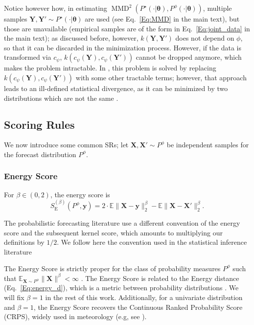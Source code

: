 \documentclass[twoside,11pt]{article}
\newcommand{\E}{\mathbb{E}}
\newcommand{\ddtheta}{\boldsymbol{\theta}}
\newcommand{\ddobs}{\mathbf{y}}
\newcommand{\Ddsim}{\mathbf{X}}
\newcommand{\Ddobs}{\mathbf{Y}}
\newcommand{\SE}{S_{\operatorname{E}}}
\begin{document}
	Notice however how, in estimating $ \operatorname{MMD}^2 \left({P}^{\star}(\cdot|\ddtheta ), {P}^{\phi}(\cdot|\ddtheta )\right)$, multiple samples $ \Ddobs,\Ddobs'\sim {P}^{\star}(\cdot|\ddtheta) $ are used (see Eq.~\ref{Eq:MMD} in the main text), but those are unavailable (empirical samples are of the form in Eq.~\ref{Eq:joint_data} in the main text); as discussed before, however, $ k(\Ddobs,\Ddobs') $ does not depend on $ \phi $, so that it can be discarded in the minimization process.
	However, if the data is transformed via $ c_\psi $, $ k(c_\psi(\Ddobs), c_\psi(\Ddobs')) $ cannot be dropped anymore, which makes the problem intractable. In \cite{bellemare2017cramer}, this problem is solved by replacing $ k(c_\psi(\Ddobs), c_\psi(\Ddobs'))  $ with some other tractable terms; however, that approach leads to an ill-defined statistical divergence, as it can be minimized by two distributions which are not the same \citep{binkowski2018demystifying}.	
	
	
	
	
	\subsection{Scoring Rules}\label{app:scores}
	We now introduce some common SRs; let $ \Ddsim,  \Ddsim' \sim P^\phi $ be independent samples for the forecast distribution $ P^\phi $.
	
	\subsubsection{Energy Score}
	For $ \beta \in (0,2) $, the energy score is
	\begin{equation}\label{Eq:eng_score}
	\SE^{(\beta)}(P^\phi, \ddobs) = 2 \cdot \E \| \Ddsim - \ddobs\|_2^\beta - \E\|\Ddsim- \Ddsim'\|_2^\beta.
	\end{equation}
	
	The probabilistic forecasting literature \citep{gneiting2007strictly} use a different convention of the energy score and the subsequent kernel score, which amounts to multiplying our definitions by $ 1/2 $. We follow here the convention used in the statistical inference literature \citep{rizzo2016energy, cherief2020mmd, nguyen2020approximate}
	
	The Energy Score is strictly proper for the class of probability measures $ P^\phi $ such that $ \E_{\Ddsim\sim P^\phi}\|\Ddsim\|^\beta < \infty $ \citep{gneiting2007strictly}. The Energy Score is related to the Energy distance (Eq.~\eqref{Eq:energy_d}), which is a metric between probability distributions \citep{rizzo2016energy}. We will fix $ \beta=1$ in the rest of this work. Additionally, for a univariate distribution and $ \beta=1 $, the Energy Score recovers the Continuous Ranked Probability Score (CRPS), widely used in meteorology (e.g, see \citealp{hersbach2000decomposition}).
	
\end{document}
